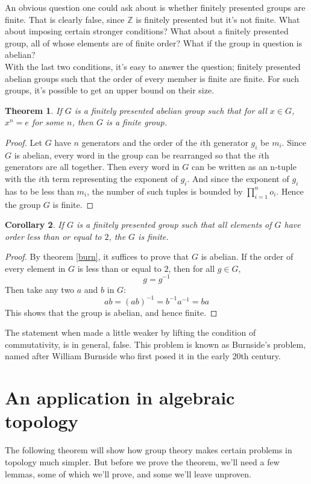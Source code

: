 \documentclass[12pt]{article}
\newtheorem{thm}{Theorem}[section]
\newtheorem{cor}[thm]{Corollary}
\theoremstyle{definition}
\begin{document}
An obvious question one could ask about is whether finitely presented groups are finite. That is clearly false, since $\mathbb{Z}$ is finitely presented but it's not finite. What about imposing certain stronger conditions? What about a finitely presented group, all of whose elements are of finite order? What if the group in question is abelian?\cite{baumslag}\\
With the last two conditions, it's easy to answer the question; finitely presented abelian groups such that the order of every member is finite are finite. For such groups, it's possible to get an upper bound on their size.

\begin{thm}\label{burn}
If $G$ is a finitely presented abelian group such that for all $x \in G$, $x^n=e$ for some $n$, then $G$ is a finite group.
\end{thm}

\begin{proof}
Let $G$ have $n$ generators and the order of the $i$th generator $g_i$ be $m_i$. Since $G$ is abelian, every word in the group can be rearranged so that the $i$th generators are all together. Then every word in $G$ can be written as an n-tuple with the $i$th term representing the exponent of $g_i$. And since the exponent of $g_i$ has to be less than $m_i$, the number of such tuples is bounded by $\prod_{i=1}^{n}o_i$. Hence the group $G$ is finite.
\end{proof}

\begin{cor}
If $G$ is a finitely presented group such that all elements of $G$ have order less than or equal to $2$, the $G$ is finite.
\end{cor}

\begin{proof}
By theorem \autoref{burn}, it suffices to prove that $G$ is abelian. If the order of every element in $G$ is less than or equal to $2$, then for all $g \in G$,
$$g=g^{-1}$$
Then take any two $a$ and $b$ in $G$:
$$ab = (ab)^{-1} = b^{-1}a^{-1} = ba$$
This shows that the group is abelian, and hence finite.
\end{proof}

The statement when made a little weaker by lifting the condition of commutativity, is in general, false. This problem is known as Burnside's problem, named after William Burnside who first posed it in the early 20th century.

\section{An application in algebraic topology}
The following theorem will show how group theory makes certain problems in topology much simpler. But before we prove the theorem, we'll need a few lemmas, some of which we'll prove, and some we'll leave unproven.
\end{document}

